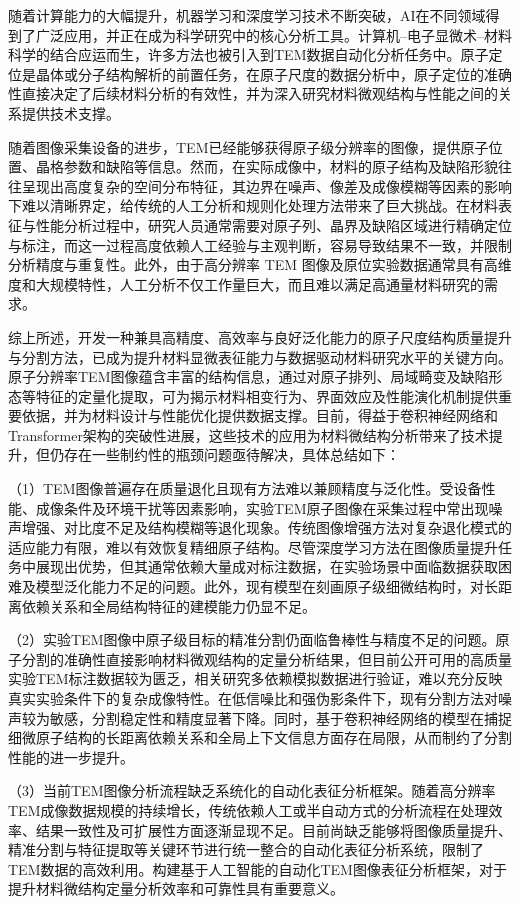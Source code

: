 随着计算能力的大幅提升，机器学习和深度学习技术不断突破，AI在不同领域得到了广泛应用，并正在成为科学研究中的核心分析工具\cite{lecun2015deep}。计算机–电子显微术–材料科学的结合应运而生，许多方法也被引入到TEM数据自动化分析任务中。原子定位是晶体或分子结构解析的前置任务，在原子尺度的数据分析中，原子定位的准确性直接决定了后续材料分析的有效性，并为深入研究材料微观结构与性能之间的关系提供技术支撑。

随着图像采集设备的进步，TEM已经能够获得原子级分辨率的图像，提供原子位置、晶格参数和缺陷等信息。然而，在实际成像中，材料的原子结构及缺陷形貌往往呈现出高度复杂的空间分布特征，其边界在噪声、像差及成像模糊等因素的影响下难以清晰界定，给传统的人工分析和规则化处理方法带来了巨大挑战。在材料表征与性能分析过程中，研究人员通常需要对原子列、晶界及缺陷区域进行精确定位与标注，而这一过程高度依赖人工经验与主观判断，容易导致结果不一致，并限制分析精度与重复性。此外，由于高分辨率 TEM 图像及原位实验数据通常具有高维度和大规模特性，人工分析不仅工作量巨大，而且难以满足高通量材料研究的需求。

综上所述，开发一种兼具高精度、高效率与良好泛化能力的原子尺度结构质量提升与分割方法，已成为提升材料显微表征能力与数据驱动材料研究水平的关键方向。原子分辨率TEM图像蕴含丰富的结构信息，通过对原子排列、局域畸变及缺陷形态等特征的定量化提取，可为揭示材料相变行为、界面效应及性能演化机制提供重要依据，并为材料设计与性能优化提供数据支撑。目前，得益于卷积神经网络和Transformer架构的突破性进展，这些技术的应用为材料微结构分析带来了技术提升，但仍存在一些制约性的瓶颈问题亟待解决，具体总结如下：

（1）TEM图像普遍存在质量退化且现有方法难以兼顾精度与泛化性。受设备性能、成像条件及环境干扰等因素影响，实验TEM原子图像在采集过程中常出现噪声增强、对比度不足及结构模糊等退化现象。传统图像增强方法对复杂退化模式的适应能力有限，难以有效恢复精细原子结构。尽管深度学习方法在图像质量提升任务中展现出优势，但其通常依赖大量成对标注数据，在实验场景中面临数据获取困难及模型泛化能力不足的问题。此外，现有模型在刻画原子级细微结构时，对长距离依赖关系和全局结构特征的建模能力仍显不足。

（2）实验TEM图像中原子级目标的精准分割仍面临鲁棒性与精度不足的问题。原子分割的准确性直接影响材料微观结构的定量分析结果，但目前公开可用的高质量实验TEM标注数据较为匮乏，相关研究多依赖模拟数据进行验证，难以充分反映真实实验条件下的复杂成像特性。在低信噪比和强伪影条件下，现有分割方法对噪声较为敏感，分割稳定性和精度显著下降。同时，基于卷积神经网络的模型在捕捉细微原子结构的长距离依赖关系和全局上下文信息方面存在局限，从而制约了分割性能的进一步提升。

（3）当前TEM图像分析流程缺乏系统化的自动化表征分析框架。随着高分辨率TEM成像数据规模的持续增长，传统依赖人工或半自动方式的分析流程在处理效率、结果一致性及可扩展性方面逐渐显现不足。目前尚缺乏能够将图像质量提升、精准分割与特征提取等关键环节进行统一整合的自动化表征分析系统，限制了TEM数据的高效利用。构建基于人工智能的自动化TEM图像表征分析框架，对于提升材料微结构定量分析效率和可靠性具有重要意义。

